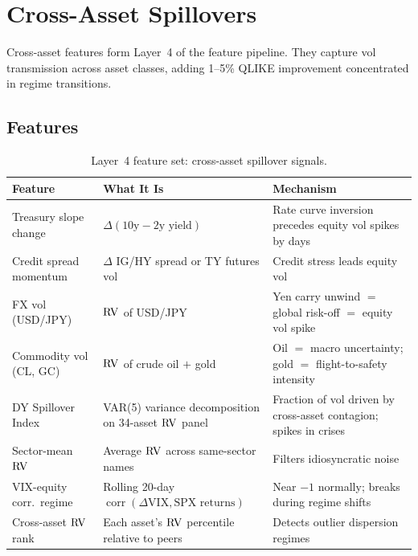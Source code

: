 \chapter{Cross-Asset Spillovers}
\label{ch:cross-asset}

Cross-asset features form Layer~4 of the feature pipeline.
They capture vol transmission across asset classes, adding 1--5\% QLIKE improvement concentrated in regime transitions.

\section{Features}
\label{sec:cross-asset-features}

\begin{table}[htbp]
\centering
\caption{Layer~4 feature set: cross-asset spillover signals.}
\label{tab:cross-asset-features}
\small
\begin{tabular}{@{}p{3.8cm}p{4.2cm}p{5.5cm}@{}}
\toprule
\textbf{Feature} & \textbf{What It Is} & \textbf{Mechanism} \\
\midrule
Treasury slope change &
  $\Delta(\text{10y} - \text{2y yield})$ &
  Rate curve inversion precedes equity vol spikes by days \\[6pt]
Credit spread momentum &
  $\Delta$ IG/HY spread or TY futures vol &
  Credit stress leads equity vol \\[6pt]
FX vol (USD/JPY) &
  $\operatorname{RV}$ of USD/JPY &
  Yen carry unwind $=$ global risk-off $=$ equity vol spike \\[6pt]
Commodity vol (CL, GC) &
  $\operatorname{RV}$ of crude oil $+$ gold &
  Oil $=$ macro uncertainty; gold $=$ flight-to-safety intensity \\[6pt]
DY Spillover Index &
  VAR(5) variance decomposition on 34-asset $\operatorname{RV}$ panel &
  Fraction of vol driven by cross-asset contagion; spikes in crises \citep{DieboldYilmaz2012} \\[6pt]
Sector-mean $\operatorname{RV}$ &
  Average $\operatorname{RV}$ across same-sector names &
  Filters idiosyncratic noise \\[6pt]
VIX-equity corr.\ regime &
  Rolling 20-day $\operatorname{corr}(\Delta\text{VIX}, \text{SPX returns})$ &
  Near $-1$ normally; breaks during regime shifts \\[6pt]
Cross-asset $\operatorname{RV}$ rank &
  Each asset's $\operatorname{RV}$ percentile relative to peers &
  Detects outlier dispersion regimes \\
\bottomrule
\end{tabular}
\end{table}


